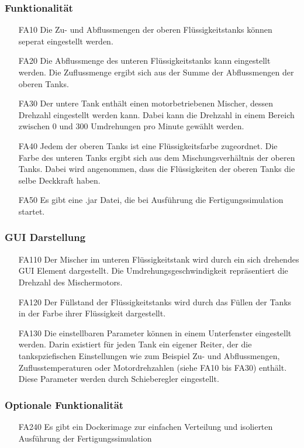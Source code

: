 \documentclass[parskip=full]{scrartcl}
\begin{document}
\subsubsection{Funktionalität}
\begin{enumerate}
\item[FA10] Die Zu- und Abflussmengen der oberen Flüssigkeitstanks können seperat eingestellt werden.
\item[FA20] Die Abflussmenge des unteren Flüssigkeitstanks kann eingestellt werden. Die Zuflussmenge ergibt sich aus der Summe der Abflussmengen der oberen Tanks.
\item[FA30] Der untere Tank enthält einen motorbetriebenen Mischer, dessen Drehzahl eingestellt werden kann. Dabei kann die Drehzahl in einem Bereich zwischen
0 und 300 Umdrehungen pro Minute gewählt werden.
\item[FA40] Jedem der oberen Tanks ist eine Flüssigkeitsfarbe zugeordnet. Die Farbe des unteren Tanks ergibt sich aus dem Mischungsverhältnis der oberen Tanks. Dabei wird
angenommen, dass die Flüssigkeiten der oberen Tanks die selbe Deckkraft haben.
\item[FA50] Es gibt eine .jar Datei, die bei Ausführung die Fertigungssimulation startet.
\end{enumerate}

\subsubsection{GUI Darstellung}
\begin{enumerate}
\item[FA110] Der Mischer im unteren Flüssigkeitstank wird durch ein sich drehendes GUI Element dargestellt.
Die Umdrehungsgeschwindigkeit repräsentiert die Drehzahl des Mischermotors.
\item[FA120] Der Füllstand der Flüssigkeitstanks wird durch das Füllen der Tanks in der Farbe ihrer Flüssigkeit dargestellt.
\item[FA130] Die einstellbaren Parameter können in einem Unterfenster eingestellt werden. Darin existiert für jeden Tank ein eigener Reiter, der die 
tankspziefischen Einstellungen wie zum Beispiel Zu- und Abflussmengen, Zuflusstemperaturen oder Motordrehzahlen (siehe FA10 bis FA30) enthält.
Diese Parameter werden durch Schieberegler eingestellt.
\end{enumerate}

\subsubsection{Optionale Funktionalität}
\label{fertigung-optional}
\begin{enumerate}
\item[FA240] Es gibt ein Dockerimage zur einfachen Verteilung und isolierten Ausführung der Fertigungssimulation
\end{enumerate}
\end{document}
